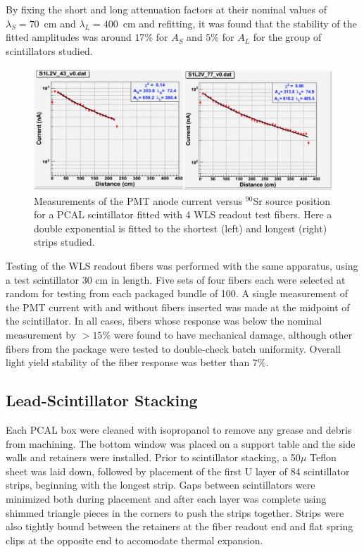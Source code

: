 By fixing the short and long attenuation factors at their nominal values of $\lambda_S=70$~cm and $\lambda_L=400$~cm and refitting, it was found that the stability of the fitted amplitudes was around $17\%$ for $A_S$ and $5\%$ for $A_L$ for the group of scintillators studied. 

\begin{figure}[hbt]
\centering
\includegraphics[width=0.95\columnwidth,keepaspectratio]{img/S5_0.png}
\caption{Measurements of the PMT anode current versus $^{90}$Sr source position for a PCAL scintillator fitted with 4 WLS readout test fibers. Here a double exponential is fitted to the shortest (left) and longest (right) strips studied. }
\label{fig:S5_0}
\end{figure}

Testing of the WLS readout fibers was performed with the same apparatus, using a test scintillator 30 cm in length.  Five sets of four fibers each were selected at random for testing from each packaged bundle of 100.  A single measurement of the PMT current with and without fibers inserted was made at the midpoint of the scintillator.  In all cases, fibers whose response was below the nominal measurement by $>15\%$ were found to have mechanical damage, although other fibers from the package were tested to double-check batch uniformity. Overall light yield stability of the fiber response was better than $7\%$.
 
\subsection{Lead-Scintillator Stacking}
Each PCAL box were cleaned with isopropanol to remove any grease and debris from machining.  The bottom window was placed on a support table and the side walls and retainers were installed. Prior to scintillator stacking, a 50$\mu$ Teflon sheet was laid down, followed by placement of the first U layer of 84 scintillator strips, beginning with the longest strip.  Gaps between scintillators were minimized both during placement and after each layer was complete using shimmed triangle pieces in the corners to push the strips together.  Strips were also tightly bound between the retainers at the fiber readout end and flat spring clips at the opposite end to accomodate thermal expansion.

